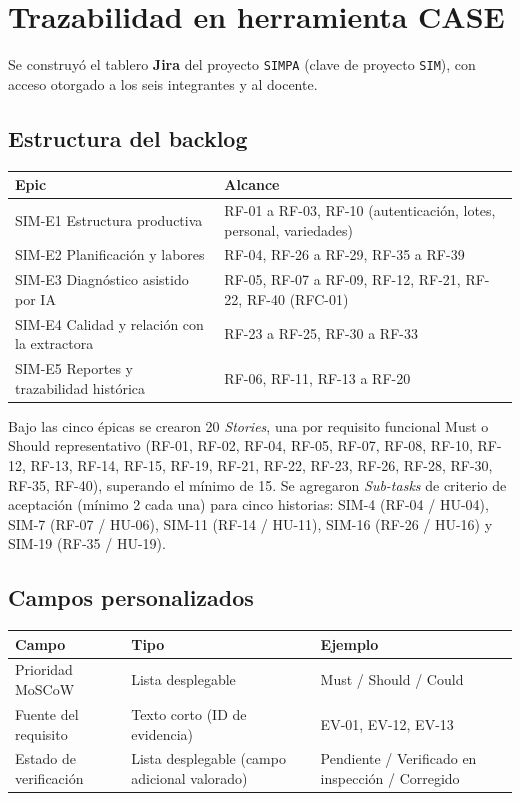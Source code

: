 \documentclass[11pt,a4paper]{article}
\begin{document}
\section{Trazabilidad en herramienta CASE}

Se construyó el tablero \textbf{Jira} del proyecto \texttt{SIMPA} (clave de proyecto
\texttt{SIM}), con acceso otorgado a los seis integrantes y al docente.

\subsection{Estructura del backlog}

\begin{center}
\begin{tabular}{p{3.2cm}p{9.5cm}}
\toprule
\textbf{Epic} & \textbf{Alcance} \\
\midrule
SIM-E1 Estructura productiva & RF-01 a RF-03, RF-10 (autenticación, lotes, personal, variedades) \\
SIM-E2 Planificación y labores & RF-04, RF-26 a RF-29, RF-35 a RF-39 \\
SIM-E3 Diagnóstico asistido por IA & RF-05, RF-07 a RF-09, RF-12, RF-21, RF-22, RF-40 (RFC-01) \\
SIM-E4 Calidad y relación con la extractora & RF-23 a RF-25, RF-30 a RF-33 \\
SIM-E5 Reportes y trazabilidad histórica & RF-06, RF-11, RF-13 a RF-20 \\
\bottomrule
\end{tabular}
\end{center}

\noindent Bajo las cinco épicas se crearon 20 \emph{Stories}, una por requisito funcional Must o
Should representativo (RF-01, RF-02, RF-04, RF-05, RF-07, RF-08, RF-10, RF-12, RF-13, RF-14,
RF-15, RF-19, RF-21, RF-22, RF-23, RF-26, RF-28, RF-30, RF-35, RF-40), superando el mínimo de 15.
Se agregaron \emph{Sub-tasks} de criterio de aceptación (mínimo 2 cada una) para cinco historias:
SIM-4 (RF-04 / HU-04), SIM-7 (RF-07 / HU-06), SIM-11 (RF-14 / HU-11), SIM-16 (RF-26 / HU-16) y
SIM-19 (RF-35 / HU-19).

\subsection{Campos personalizados}

\begin{center}
\begin{tabular}{lll}
\toprule
\textbf{Campo} & \textbf{Tipo} & \textbf{Ejemplo} \\
\midrule
Prioridad MoSCoW & Lista desplegable & Must / Should / Could \\
Fuente del requisito & Texto corto (ID de evidencia) & EV-01, EV-12, EV-13 \\
Estado de verificación & Lista desplegable (campo adicional valorado) & Pendiente / Verificado en inspección / Corregido \\
\bottomrule
\end{tabular}
\end{center}
\end{document}
